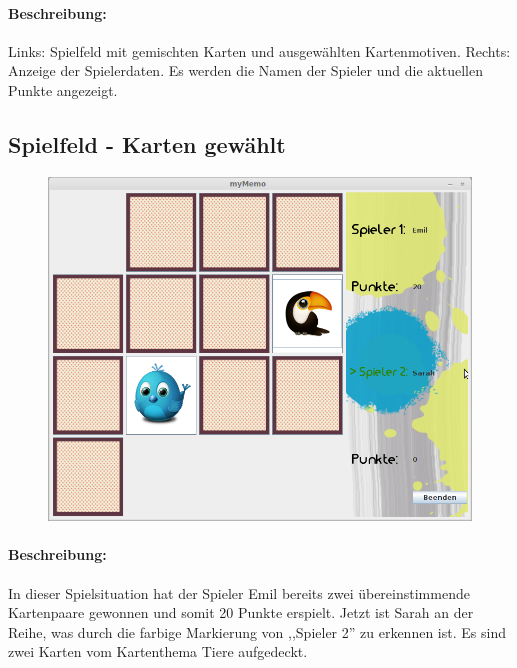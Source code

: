 \paragraph{Beschreibung: }Links: Spielfeld mit gemischten Karten und ausgewählten Kartenmotiven. Rechts: Anzeige der Spielerdaten. Es werden die Namen der Spieler und die aktuellen Punkte angezeigt.


\clearpage
\subsection{Spielfeld - Karten gewählt}
\begin{figure}[!h]
	\centering
    \includegraphics[width=\textwidth]{./guiSpielCards.png}
	\label{}
\end{figure}
\paragraph{Beschreibung: }In dieser Spielsituation hat der Spieler Emil bereits zwei übereinstimmende Kartenpaare gewonnen und somit 20 Punkte erspielt. Jetzt ist Sarah an der Reihe, was durch die farbige Markierung von ,,Spieler 2'' zu erkennen ist. Es sind zwei Karten vom Kartenthema Tiere aufgedeckt.


\clearpage
